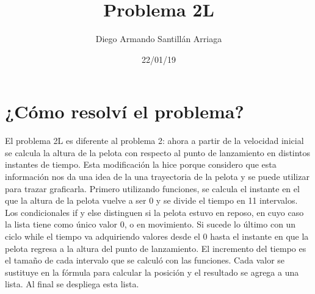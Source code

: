 \documentclass[letterpaper, 12pt, oneside]{article}%
\title{\Huge Problema 2L}
\author{Diego Armando Santillán Arriaga}
\date{22/01/19}
\begin{document}
\maketitle
\newpage
\section*{¿Cómo resolví el problema?}
El problema 2L es diferente al problema 2: ahora a partir de la velocidad inicial se calcula la altura de la pelota con respecto al punto de lanzamiento en distintos
instantes de tiempo. Esta modificación la hice porque considero que esta información nos da una idea de la una trayectoria de la pelota y se puede utilizar para trazar graficarla.
Primero utilizando funciones, se calcula el instante en el que la altura de la pelota vuelve a ser 0 y se divide el tiempo en 11 intervalos. Los condicionales if y else distinguen si la pelota estuvo en reposo, en cuyo caso la lista tiene como único valor 0, o en movimiento. Si sucede lo último con un ciclo while el tiempo va adquiriendo valores desde el 0 hasta el instante en que la pelota regresa a la altura del punto de lanzamiento. El incremento del tiempo es el tamaño de cada intervalo que se calculó con las funciones. Cada valor se sustituye en la fórmula para calcular la posición y el resultado se agrega a una lista. Al final se despliega esta lista. 
\end{document}
